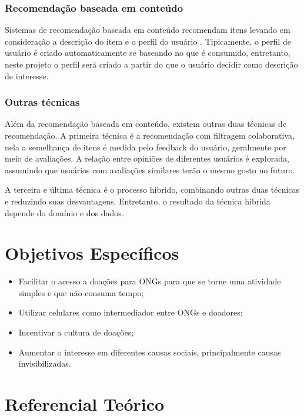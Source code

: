 \documentclass[conference]{IEEEtran}
\begin{document}
\subsubsection{Recomendação baseada em conteúdo}
 Sistemas de recomendação baseada em conteúdo recomendam itens levando em consideração a descrição do item e o perfil do usuário \cite{sharma2013survey}. Tipicamente, o perfil de usuário é criado automaticamente se baseando no que é consumido, entretanto, neste projeto o perfil será criado a partir do que o usuário decidir como descrição de interesse. 

\subsubsection{Outras técnicas}
Além da recomendação baseada em conteúdo, existem outras duas técnicas de recomendação. 
A primeira técnica é a recomendação com filtragem colaborativa, nela a semelhança de itens é medida pelo feedback do usuário, geralmente por meio de avaliações. A relação entre opiniões de diferentes usuários é explorada, assumindo que usuários com avaliações similares terão o mesmo gosto no futuro. \cite{sharma2013survey}

A terceira e última técnica é o processo hibrido, combinando outras duas técnicas e reduzindo suas desvantagens. Entretanto, o resultado da técnica hibrida depende do domínio e dos dados. \cite{ccano2017hybrid}


\section{Objetivos Específicos}
\begin{itemize}
\item Facilitar o acesso a doações para ONGs para que se torne uma atividade simples e que não consuma tempo;
\item Utilizar celulares como intermediador entre ONGs e doadores;
\item Incentivar a cultura de doações;
\item Aumentar o interesse em diferentes causas sociais, principalmente causas invisibilizadas.
\end{itemize}



\section{Referencial Teórico}
\end{document}
